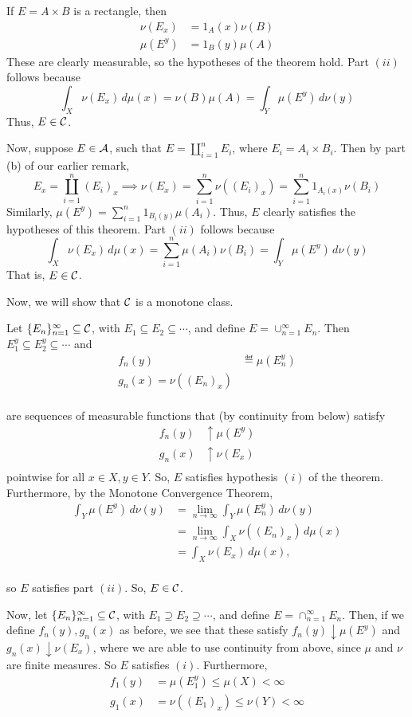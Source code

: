 \documentclass[x11names,reqno,14pt]{extarticle}
\newcommand*{\oo}{\infty}
\newcommand{\seq}[1]{_{#1 = 1}^\oo}
\begin{document}
If $E = A\times B$ is a rectangle, then
\begin{align*}
\nu(E_x) & = 1_A(x)\nu(B) \\
\mu(E^y) & = 1_B(y)\mu(A)
\end{align*}
These are clearly measurable, so the hypotheses of the theorem hold. Part $(ii)$ follows because 
\[
\int_X\nu(E_x)\,d\mu(x) = \nu(B)\mu(A) = \int_Y\mu(E^y)\,d\nu(y)
\]
Thus, $E \in \mathcal{C}$. 

Now, suppose $E \in \mathcal{A}$, such that $E = \coprod_{i=1}^nE_i$, where $E_i = A_i \times B_i$. Then by part (b) of our earlier remark, 
\[
E_x = \coprod_{i=1}^n(E_i)_x \implies\nu(E_x) = \sum_{i=1}^n\nu((E_i)_x) = \sum_{i=1}^n1_{A_i(x)}\nu(B_i)
\]
Similarly, $\mu(E^y) = \sum_{i=1}^n1_{B_i(y)}\mu(A_i)$. Thus, $E$ clearly satisfies the hypotheses of this theorem. Part $(ii)$ follows because
\[
\int_X\nu(E_x)\,d\mu(x) = \sum_{i=1}^n\mu(A_i)\nu(B_i) = \int_Y\mu(E^y)\,d\nu(y)
\]
That is, $E \in \mathcal{C}$. 

Now, we will show that $\mathcal{C}$ is a monotone class. 

Let $\{E_n\}\seq{n}\subseteq\mc{C}$, with $E_1\subseteq E_2 \subseteq \cdots$, and define $E = \cup\seq{n}E_n$. Then $E_1^y \subseteq E_2^y \subseteq \cdots$ and 
\begin{align*}
f_n(y) & \eqdef \mu(E_n^y) \\
g_n(x) = \nu((E_n)_x) \\
\end{align*}

are sequences of measurable functions that (by continuity from below) satisfy
\begin{align*}
f_n(y) &\uparrow \mu(E^y) \\
g_n(x) &\uparrow \nu(E_x) \\
\end{align*}
pointwise for all $x \in X, y \in Y$. So, $E$ satisfies hypothesis $(i)$ of the theorem. Furthermore, by the Monotone Convergence Theorem, 
\begin{align*}
\int_Y\mu(E^y)\,d\nu(y) & = \lim_{n\to\oo}\int_Y\mu(E_n^y)\,d\nu(y) \\
& = \lim_{n\to\oo}\int_X\nu((E_n)_x)\,d\mu(x) \\
& = \int_X\nu(E_x)\,d\mu(x), \\
\end{align*}

so $E$ satisfies part $(ii)$. So, $E \in \mathcal{C}$. 

Now, let $\{E_n\}\seq{n}\subseteq\mc{C}$, with $E_1\supseteq E_2 \supseteq \cdots$, and define $E = \cap\seq{n}E_n$. Then, if we define $f_n(y), g_n(x)$ as before, we see that these satisfy $f_n(y)\downarrow\mu(E^y)$ and $g_n(x)\downarrow\nu(E_x)$, where we are able to use continuity from above, since $\mu$ and $\nu$ are finite measures. So $E$ satisfies $(i)$. Furthermore, 
\begin{align*}
f_1(y) & = \mu(E_1^y)  \leq \mu(X)<\oo \\
g_1(x) & = \nu((E_1)_x)  \leq \nu(Y) < \oo \\
\end{align*}
\end{document}
